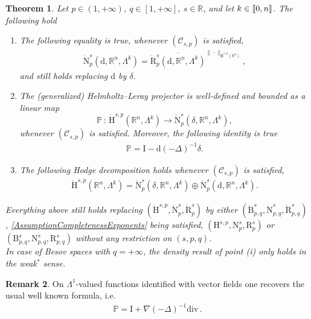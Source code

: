 \documentclass[10pt]{amsart}
\newtheorem{theo}{Theorem}[section]
\theoremstyle{definition}\newtheorem{defi}[theo]{Definition}\newtheorem{rema}[theo]{Remark}\newtheorem{exam}[theo]{Example}\newtheorem{exem}[theo]{Example}\newtheorem{nota}[theo]{Notation}
\renewcommand*{\div}{\mathrm{div\,}}
\newcommand{\bbP}{\mathbb{P}}
\newcommand{\bbR}{\mathbb{R}}
\newcommand{\rmH}{\mathrm{H}}%
\newcommand{\rmB}{\mathrm{B}}
\newcommand{\rmd}{\mathrm{d}}
\newcommand{\rmR}{\mathrm{R}}
\newcommand{\rmN}{\mathrm{N}}
\newcommand{\rmI}{\mathrm{I}}
\newcommand{\clC}{\mathcal{C}}
\newcommand{\llbracket}{\mathopen{[\mkern -2.7mu[}}
\newcommand{\rrbracket}{\mathclose{]\mkern -2.7mu]}}
\newcommand{\llb}{\llbracket}
\newcommand{\rrb}{\rrbracket}
\newcommand*{\romanenumi}{\renewcommand*{\theenumi}{\roman{enumi}}}
\begin{document}
\begin{theo}\label{thm:HodgeDecompRn}
Let $p\in(1,+\infty)$, $q\in[1,+\infty]$, $s\in\bbR$, and let $k\in\llb 0,n\rrb$. The following hold
\begin{enumerate}\romanenumi
\item\label{theo2.9.1} The following equality is true, whenever $(\clC_{s,p})$ is satisfied,
\begin{align*}
\dot{\rmN}^{s}_{p}\left(\rmd,\bbR^n,\Lambda^k\right) = \overline{\dot{\rmR}^{s}_{p}\left(\rmd,\bbR^n,\Lambda^k\right)}^{\|\cdot\|_{\dot{\rmH}^{s,p}(\bbR^n)}},
\end{align*}
and still holds replacing $\rmd$ by $\delta$.

\item The (generalized) Helmholtz--Leray projector is well-defined and bounded as a linear map
\[
\bbP\,:\, \dot{\rmH}^{s,p}\left(\bbR^n,\Lambda^k\right)\longrightarrow \dot{\rmN}^{s}_{p}\left(\delta,\bbR^n,\Lambda^k\right),
\]
whenever $(\clC_{s,p})$ is satisfied. Moreover, the following identity is true
\begin{align*}
\bbP = \rmI  - \rmd(-\Delta)^{-1}\delta .
\end{align*}

\item The following Hodge decomposition holds whenever $(\clC_{s,p})$ is satisfied,
\begin{align*}
\dot{\rmH}^{s,p}\left(\bbR^n,\Lambda^k\right) = \dot{\rmN}^{s}_{p}\left(\delta,\bbR^n,\Lambda^k\right) \oplus \dot{\rmN}^{s}_{p}\left(\rmd,\bbR^n,\Lambda^k\right).
\end{align*}
\end{enumerate}
Everything above still holds replacing
$(\dot{\rmH}^{s,p},\dot{\rmN}^{s}_{p},\dot{\rmR}^{s}_{p})$ by either $(\dot{\rmB}^{s}_{p,q},\dot{\rmN}^{s}_{p,q},\dot{\rmR}^{s}_{p,q})$, \eqref{AssumptionCompletenessExponents} being satisfied, $({\rmH}^{s,p},{\rmN}^{s}_{p},{\rmR}^{s}_{p})$ or $({\rmB}^{s}_{p,q},{\rmN}^{s}_{p,q},{\rmR}^{s}_{p,q})$ without any restriction on $(s,p,q)$.\\
In case of Besov spaces with $q=+\infty$, the density result of point \emph{(i)} only holds in the weak${}^\ast$ sense.
\end{theo}


\begin{rema}
On $\Lambda^1$-valued functions identified with vector fields one recovers the usual well known formula, i.e.
\begin{align*}
\bbP=\rmI + \nabla (-\Delta)^{-1}\div .
\end{align*}
\end{rema}
\end{document}
